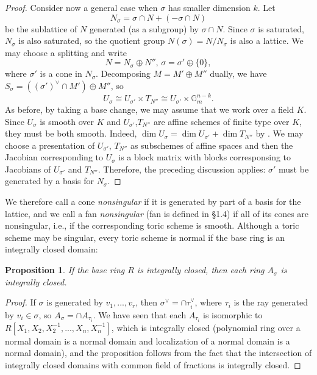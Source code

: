 \documentclass[10pt,a4paper]{book}
\newtheorem*{prop*}{Proposition}
\newcommand{\on}{\operatorname}
\begin{document}
\begin{proof}
Consider now a general case when $\sigma$ has smaller dimension $k$. Let
\[
N_\sigma = \sigma\cap N + (-\sigma \cap N)
\]
be the sublattice of $N$ generated (as a subgroup) by $\sigma\cap N$. Since $\sigma$ is
saturated, $N_\sigma$ is also saturated, so the quotient group $N(\sigma) = N/N_\sigma$ is
also a lattice. We may choose a splitting and write
\[
N=N_\sigma \oplus N'' \text{, } \sigma =\sigma'\oplus \{0\},
\]
where $\sigma'$ is a cone in $N_\sigma$. Decomposing $M = M'\oplus M''$ dually, we
have $S_\sigma = ((\sigma')^\vee \cap M')\oplus M''$, so
\[
U_\sigma \cong U_{\sigma'}\times T_{N''} \cong U_{\sigma'}\times \mathbb{G}_m^{n-k}.
\]
As before, by taking a base change, we may assume that we work over a field $K$. Since $U_\sigma$ is smooth over $K$ and $U_{\sigma'}$,$T_{N''}$ are affine schemes of finite type over $K$, they must be both smooth.
Indeed, $\on{dim} U_\sigma = \on{dim}U_{\sigma'}+\on{dim}T_{N''}$ by \cite[Prop.~5.37]{gortz2010algebraic}. We may choose a presentation of $U_{\sigma'}$, $T_{N''}$ as subschemes of affine spaces and then the Jacobian corresponding to $U_\sigma$ is a block matrix with blocks corresponsing to Jacobians of $U_{\sigma'}$ and $T_{N''}$. Therefore, the preceding discussion applies: $\sigma'$ must be generated by a basis for $N_\sigma$.
\end{proof}

We therefore call a cone \textit{nonsingular} if it is generated by part of a basis for the lattice, and we call a fan \textit{nonsingular} (fan is defined in \S 1.4) if all of its cones
are nonsingular, i.e., if the corresponding toric scheme is smooth. Although a toric scheme may be singular, every toric scheme is normal if the base ring is an integrally closed domain:

\begin{prop*} If the base ring $R$ is integrally closed, then each ring $A_\sigma$ is integrally closed.
\end{prop*}
\begin{proof}
If $\sigma$ is generated by $v_1,...,v_r$, then $\sigma^\vee = \cap \tau_i^\vee$, where
$\tau_i$ is the ray generated by $v_i\in \sigma$, so $A_\sigma = \cap A_{\tau_i}$. We have seen that each $A_{\tau_i}$ is isomorphic to $R[X_1,X_2, X_2^{-1}, ..., X_n, X_n^{-1}]$, which is integrally closed (polynomial ring over a normal domain is a normal domain and localization of a normal domain is a normal domain), and the proposition follows from the fact that the intersection of integrally closed domains with common field of fractions is integrally closed.
\end{proof}




\end{document}
